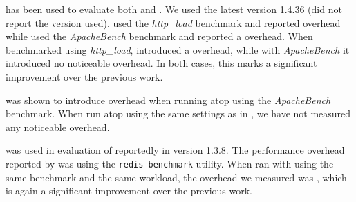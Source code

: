 
\boldtext{\lighttpd} %
has been used to evaluate both \mx and \tachyon.  We used the latest
version 1.4.36 (\tachyon did not report the version used). \mx used
the \emph{http\_load} benchmark and reported \mxLighttpd overhead
while \tachyon used the \emph{ApacheBench} benchmark and reported a
\tachyonLighttpd overhead.  When benchmarked using \emph{http\_load},
\varan introduced a \lighttpdHttploadOneFollower overhead, while with
\emph{ApacheBench} it introduced no noticeable overhead.  In both cases, this
marks a significant improvement over the previous work.

\boldtext{\thttpd} %
was shown to introduce \tachyonThttpd overhead when running atop \tachyon using
the \emph{ApacheBench} benchmark. When run atop \nx using the same settings
as in \cite{tachyon12}, we have not measured any noticeable overhead.

\boldtext{\redis} %
was used in evaluation of \mx reportedly in version 1.3.8.  The performance
overhead reported by \mx was \mxRedis using the \lstinline`redis-benchmark`
utility. When ran with \nx using the same benchmark and the same workload,
the overhead we measured was \redisOneFollower, which is again a significant
improvement over the previous work.



